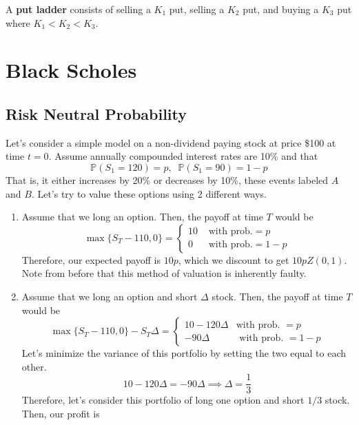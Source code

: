 \documentclass{article}
\begin{document}
    \begin{definition}
      A \textbf{put ladder} consists of selling a $K_1$ put, selling a $K_2$ put, and buying a $K_3$ put where $K_1 < K_2 < K_3$. 
    \end{definition}

\section{Black Scholes}

  \subsection{Risk Neutral Probability}

    Let's consider a simple model on a non-dividend paying stock at price \$100 at time $t = 0$. Assume annually compounded interest rates are 10\% and that 
    \begin{equation}
      \mathbb{P}(S_1 = 120) = p, \;\; \mathbb{P}(S_1 = 90) = 1 - p
    \end{equation}
    That is, it either increases by 20\% or decreases by 10\%, these events labeled $A$ and $B$. Let's try to value these options using 2 different ways. 
    \begin{enumerate}
      \item Assume that we long an option. Then, the payoff at time $T$ would be 
        \begin{equation}
          \max\{S_T - 110, 0\} = \begin{cases}
            10 & \text{ with prob.} = p \\ 
            0 & \text{ with prob.} = 1 - p 
          \end{cases} 
        \end{equation}
        Therefore, our expected payoff is $10p$, which we discount to get $10p Z(0, 1)$. Note from before that this method of valuation is inherently faulty. 

      \item Assume that we long an option and short $\Delta$ stock. Then, the payoff at time $T$ would be 
        \begin{equation}
          \max\{S_T - 110, 0\} - S_T \Delta = \begin{cases} 
            10 - 120 \Delta & \text{with prob. } = p  \\ 
            - 90\Delta & \text{ with prob. } = 1 - p
          \end{cases} 
        \end{equation}
        Let's minimize the variance of this portfolio by setting the two equal to each other. 
        \begin{equation}
          10 - 120 \Delta = -90 \Delta \implies \Delta = \frac{1}{3}
        \end{equation}
        Therefore, let's consider this portfolio of long one option and short $1/3$ stock. Then, our profit is 
    \end{enumerate}
\end{document}
